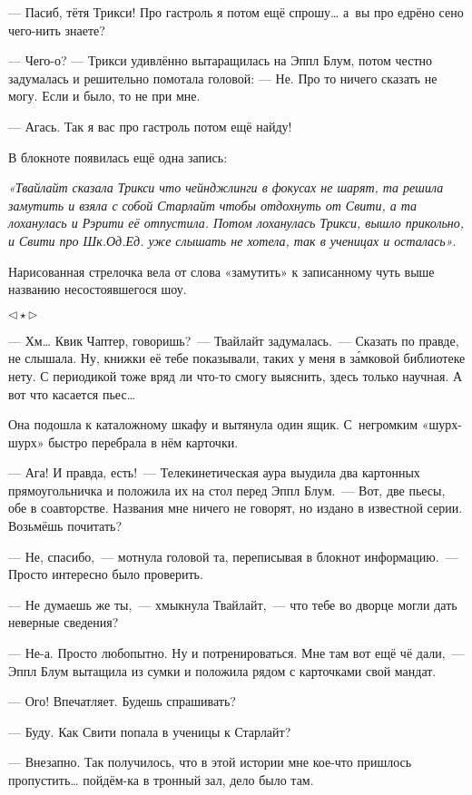 \documentclass[fontsize=11pt,a5paper,titlepage=firstcover]{scrbook}
\begin{document}
--- Пасиб, тётя Трикси! Про гастроль я потом ещё спрошу{\ldots} а~вы про едрёно сено чего-нить знаете?

--- Чего-о? --- Трикси удивлённо вытаращилась на Эппл Блум, потом честно задумалась и решительно помотала головой: --- Не. Про то ничего сказать не могу. Если и было, то не при мне.

--- Агась. Так я вас про гастроль потом ещё найду!

В блокноте появилась ещё одна запись:

\emph{«Твайлайт сказала Трикси что чейнджлинги в фокусах не шарят, та решила замутить и взяла с собой Старлайт чтобы отдохнуть от Свити, а та лоханулась и Рэрити её отпустила. Потом лоханулась Трикси, вышло прикольно, и Свити про Шк.Од.Ед. уже слышать не хотела, так в ученицах и осталась»}.

Нарисованная стрелочка вела от слова «замутить» к записанному чуть выше названию несостоявшегося шоу.
\begin{center}$\triangleleft\star\triangleright$\end{center}

--- Хм{\ldots} Квик Чаптер, говоришь?~--- Твайлайт задумалась.~--- Сказать по правде, не слышала. Ну, книжки её тебе показывали, таких у меня в за́мковой библиотеке нету. С периодикой тоже вряд ли что-то смогу выяснить, здесь только научная. А вот что касается пьес{\ldots}

Она подошла к каталожному шкафу и вытянула один ящик. С~негромким «шурх-шурх» быстро перебрала в нём карточки.

--- Ага! И правда, есть!~--- Телекинетическая аура выудила два картонных прямоугольничка и положила их на стол перед Эппл Блум.~--- Вот, две пьесы, обе в соавторстве. Названия мне ничего не говорят, но издано в известной серии. Возьмёшь почитать?

--- Не, спасибо,~--- мотнула головой та, переписывая в блокнот информацию.~--- Просто интересно было проверить.

--- Не думаешь же ты,~--- хмыкнула Твайлайт,~--- что тебе во дворце могли дать неверные сведения?

--- Не-а. Просто любопытно. Ну и потренироваться. Мне там вот ещё чё дали,~--- Эппл Блум вытащила из сумки и положила рядом с карточками свой мандат.

--- Ого! Впечатляет. Будешь спрашивать?

--- Буду. Как Свити попала в ученицы к Старлайт?

--- Внезапно. Так получилось, что в этой истории мне кое-что пришлось пропустить{\ldots} пойдём-ка в тронный зал, дело было там.
\end{document}
